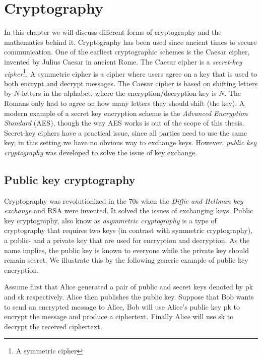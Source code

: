 \chapter{Cryptography\label{crypto}}
In this chapter we will discuss different forms of cryptography and the
mathematics behind it. Cryptography has been used since ancient times to secure
communication. One of the earliest cryptographic schemes is the Caesar cipher,
invented by Julius Caesar in ancient Rome. The Caesar cipher is a
\textit{secret-key cipher}\footnote{A symmetric cipher}. A symmetric cipher is
a cipher where users agree on a key that is used to both encrypt and decrypt
messages. The Caesar cipher is based on shifting letters by $N$ letters in the
alphabet, where the encryption/decryption key is $N$. The Romans only had to
agree on how many letters they should shift (the key). A modern example of a
secret key encryption scheme is the \textit{Advanced Encryption Standard}
(AES), though the way AES works is out of the scope of this thesis. Secret-key
ciphers have a practical issue, since all parties need to use the same key, in
this setting we have no obvious way to exchange keys. However, \textit{public
key cryptography} was developed to solve the issue of key exchange.


\section{Public key cryptography}
Cryptography was revolutionized in the 70s when the \textit{Diffie and Hellman
key exchange} and RSA were invented. It solved the issues of exchanging keys.
Public key cryptography, also know as \textit{asymmetric cryptography}
is a type of cryptography that requires two keys (in contrast with
symmetric cryptography), a public- and a private key that are used for
encryption and decryption. As the name implies, the public key is known to
everyone while the private key should remain secret. We illustrate this by the
following generic example of public key encryption.

\begin{example}
    Assume first that Alice generated a pair of public and secret keys denoted
    by pk and sk respectively. Alice then publishes the public key. Suppose that
    Bob wants to send an encrypted message to Alice, Bob will use Alice's
    public key pk to encrypt the message and produce a ciphertext. Finally
    Alice will use sk to decrypt the received ciphertext.
\end{example}

